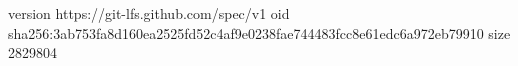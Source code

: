 version https://git-lfs.github.com/spec/v1
oid sha256:3ab753fa8d160ea2525fd52c4af9e0238fae744483fcc8e61edc6a972eb79910
size 2829804
